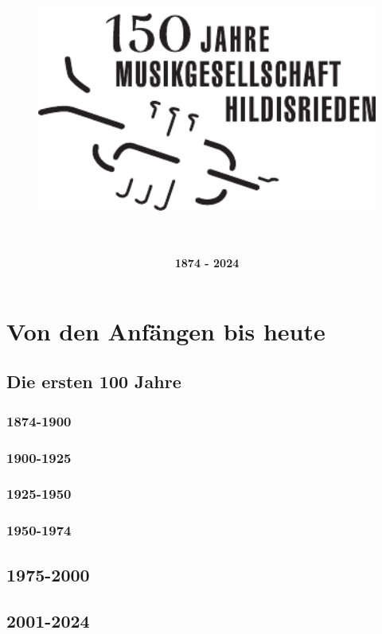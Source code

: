 \documentclass[]{book}
\title{\begin{figure}
    \vspace*{2cm}
    \centering
    \includegraphics[width=12cm, keepaspectratio]{./Jubiläumslogo.pdf}
\end{figure}
}
\date{\centering\normalfont\sffamily\Huge\bfseries\\1874 - 2024}
\begin{document}
\frontmatter

\maketitle




\renewcommand{\baselinestretch}{0.8}\normalsize
\tableofcontents
\renewcommand{\baselinestretch}{1.0}\normalsize

\mainmatter


\part{Von den Anfängen bis heute}

\chapter{Die ersten 100 Jahre}


\section*{1874-1900}




\section*{1900-1925}

\clearpage

\section*{1925-1950}

\clearpage

\section*{1950-1974}



\chapter{1975-2000}


\chapter{2001-2024}

\end{document}
